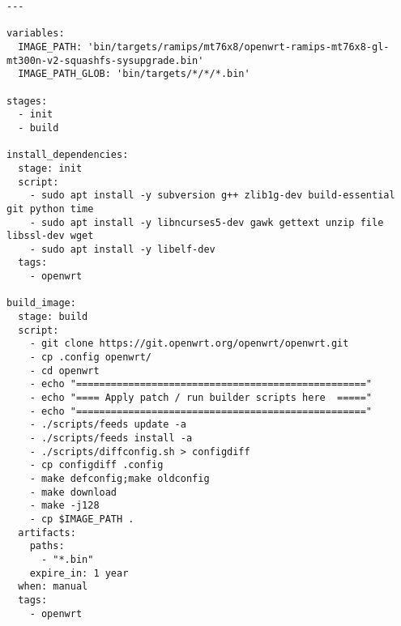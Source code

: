 \begin{lstlisting}[frame=single, basicstyle=\tiny]
---

variables:
  IMAGE_PATH: 'bin/targets/ramips/mt76x8/openwrt-ramips-mt76x8-gl-mt300n-v2-squashfs-sysupgrade.bin'
  IMAGE_PATH_GLOB: 'bin/targets/*/*/*.bin'

stages:
  - init
  - build

install_dependencies:
  stage: init
  script:
    - sudo apt install -y subversion g++ zlib1g-dev build-essential git python time
    - sudo apt install -y libncurses5-dev gawk gettext unzip file libssl-dev wget
    - sudo apt install -y libelf-dev
  tags:
    - openwrt

build_image:
  stage: build
  script:
    - git clone https://git.openwrt.org/openwrt/openwrt.git
    - cp .config openwrt/
    - cd openwrt
    - echo "=================================================="
    - echo "==== Apply patch / run builder scripts here  ====="
    - echo "=================================================="
    - ./scripts/feeds update -a
    - ./scripts/feeds install -a
    - ./scripts/diffconfig.sh > configdiff
    - cp configdiff .config
    - make defconfig;make oldconfig
    - make download
    - make -j128
    - cp $IMAGE_PATH .
  artifacts:
    paths:
      - "*.bin"
    expire_in: 1 year
  when: manual
  tags:
    - openwrt

\end{lstlisting}